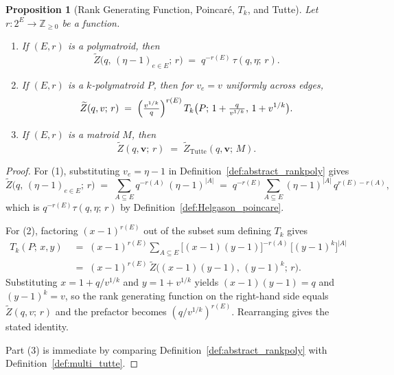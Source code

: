 \documentclass[11pt,reqno]{amsart}
\newcommand{\vecv}{\boldsymbol{v}}
\theoremstyle{plain}
\newtheorem{proposition}[theorem]{Proposition}
\theoremstyle{definition}
\numberwithin{equation}{section}
\begin{document}
\begin{proposition}[Rank Generating Function, Poincar\'e, $T_k$, and Tutte]
\label{prop:rankpoly_specializations}
Let $r \colon 2^E \to \mathbb{Z}_{\geq 0}$ be a function.
\begin{enumerate}
    \item If $(E, r)$ is a polymatroid, then
    \[
        \widetilde Z\bigl(q,\, (\eta - 1)_{e \in E};\, r\bigr)
        \;=\;
        q^{-r(E)}\, \tau(q, \eta;\, r).
    \]
    \item If $(E, r)$ is a $k$-polymatroid $P$, then for $v_e = v$
    uniformly across edges,
    \[
        \widetilde Z(q, v;\, r)
        \;=\;
        \Bigl(\tfrac{v^{1/k}}{q}\Bigr)^{r(E)}\,
        T_k\bigl(P;\, 1 + \tfrac{q}{v^{1/k}},\, 1 + v^{1/k}\bigr).
    \]
    \item If $(E, r)$ is a matroid $M$, then
    \[
        \widetilde Z(q, \vecv;\, r)
        \;=\;
        \widetilde Z_{\mathrm{Tutte}}(q, \vecv;\, M).
    \]
\end{enumerate}
\end{proposition}

\begin{proof}
For (1), substituting $v_e = \eta - 1$ in
Definition~\ref{def:abstract_rankpoly} gives
\[
    \widetilde Z\bigl(q,\, (\eta - 1)_{e \in E};\, r\bigr)
    \;=\;
    \sum_{A \subseteq E} q^{-r(A)}\, (\eta - 1)^{|A|}
    \;=\;
    q^{-r(E)} \sum_{A \subseteq E} (\eta - 1)^{|A|}\,
        q^{r(E) - r(A)},
\]
which is $q^{-r(E)} \tau(q, \eta;\, r)$ by
Definition~\ref{def:Helgason_poincare}.

For (2), factoring $(x-1)^{r(E)}$ out of the subset sum defining
$T_k$ gives
\begin{align*}
    T_k(P;\, x, y)
    \;&=\;
    (x-1)^{r(E)}
    \sum_{A \subseteq E} \bigl[(x-1)(y-1)\bigr]^{-r(A)}\,
        \bigl[(y-1)^k\bigr]^{|A|} \\
    \;&=\;
    (x-1)^{r(E)}\, \widetilde Z\bigl((x-1)(y-1),\, (y-1)^k;\, r\bigr).
\end{align*}
Substituting $x = 1 + q/v^{1/k}$ and $y = 1 + v^{1/k}$ yields
$(x-1)(y-1) = q$ and $(y-1)^k = v$, so the rank generating function on the
right-hand side equals $\widetilde Z(q, v;\, r)$ and the prefactor
becomes $(q/v^{1/k})^{r(E)}$. Rearranging gives the stated
identity.

Part (3) is immediate by comparing
Definition~\ref{def:abstract_rankpoly} with
Definition~\ref{def:multi_tutte}.
\end{proof}
\end{document}

